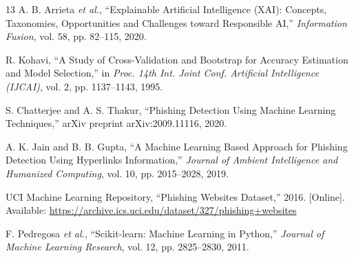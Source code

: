 \documentclass[conference]{IEEEtran}
\begin{document}
\begin{thebibliography}{13}
A. B. Arrieta \textit{et al.}, ``Explainable Artificial Intelligence (XAI): Concepts, Taxonomies, Opportunities and Challenges toward Responsible AI,'' \textit{Information Fusion}, vol. 58, pp. 82--115, 2020.

R. Kohavi, ``A Study of Cross-Validation and Bootstrap for Accuracy Estimation and Model Selection,'' in \textit{Proc. 14th Int. Joint Conf. Artificial Intelligence (IJCAI)}, vol. 2, pp. 1137--1143, 1995.

S. Chatterjee and A. S. Thakur, ``Phishing Detection Using Machine Learning Techniques,'' arXiv preprint arXiv:2009.11116, 2020.

A. K. Jain and B. B. Gupta, ``A Machine Learning Based Approach for Phishing Detection Using Hyperlinks Information,'' \textit{Journal of Ambient Intelligence and Humanized Computing}, vol. 10, pp. 2015--2028, 2019.

UCI Machine Learning Repository, ``Phishing Websites Dataset,'' 2016. [Online]. Available: \url{https://archive.ics.uci.edu/dataset/327/phishing+websites}

F. Pedregosa \textit{et al.}, ``Scikit-learn: Machine Learning in Python,'' \textit{Journal of Machine Learning Research}, vol. 12, pp. 2825--2830, 2011.

\end{thebibliography}
\end{document}
